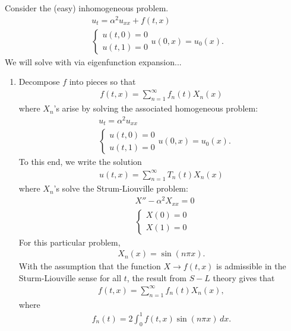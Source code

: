 \documentclass{article}
\theoremstyle{definition}
\begin{document}
Consider the (easy) inhomogeneous problem. 
\begin{align*}
&u_t = \alpha^2 u_{xx} + f(t,x)\\
&\begin{cases}
u(t,0) = 0\\
u(t,1) = 0
\end{cases}
u(0,x) = u_0(x).
\end{align*}
We will solve with via eigenfunction expansion...
\begin{enumerate}
	\item Decompose $f$ into pieces so that
	\begin{align*}
	f(t,x) = \sum^\infty_{n=1}f_n(t)X_n(x)
	\end{align*}
	where $X_n$'s arise by solving the associated homogeneous problem:
	\begin{align*}
	&u_t = \alpha^2 u_{xx}\\
	&\begin{cases}
	u(t,0) = 0\\
	u(t,1) = 0
	\end{cases}
	u(0,x) = u_0(x).
	\end{align*}
	To this end, we write the solution
	\begin{align*}
	u(t,x) = \sum^\infty_{n=1}T_n(t)X_n(x)
	\end{align*}
	where $X_n$'s solve the Strum-Liouville problem:
	\begin{align*}
	&X'' - \alpha^2 X_{xx} = 0\\
	&\begin{cases}
	X(0) = 0\\
	X(1) = 0
	\end{cases}
	\end{align*}
	For this particular problem, 
	\begin{align*}
	X_n(x) = \sin(n\pi x).
	\end{align*}
	With the assumption that the function $X \to f(t,x)$ is admissible in the Sturm-Liouville sense for all $t$, the result from $S-L$ theory gives that 
	\begin{align*}
	f(t,x) = \sum_{n=1}^\infty f_n(t)X_n(x),
	\end{align*}
	where
	\begin{align*}
	f_n(t) = 2\int^1_0 f(t,x)\sin(n\pi x)\,dx.
	\end{align*}
	
	
	

\end{enumerate}
\end{document}
